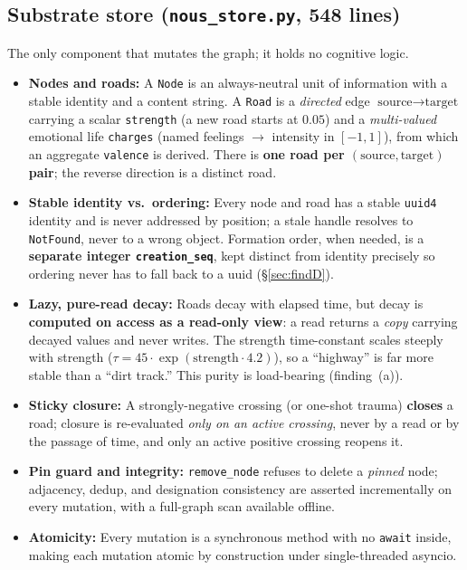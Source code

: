 \documentclass[11pt]{article}
\newcommand{\code}[1]{\texttt{#1}}
\begin{document}
\subsection{Substrate store (\code{nous_store.py}, 548 lines)}
The only component that mutates the graph; it holds no cognitive logic.
\begin{itemize}[nosep]
  \item \textbf{Nodes and roads:} A \code{Node} is an always-neutral unit of information with a stable
        identity and a content string. A \code{Road} is a \emph{directed} edge $\text{source}
        \rightarrow \text{target}$ carrying a scalar \code{strength} (a new road starts at $0.05$) and
        a \emph{multi-valued} emotional life \code{charges} (named feelings $\rightarrow$ intensity in
        $[-1,1]$), from which an aggregate \code{valence} is derived. There is \textbf{one road per
        $(\text{source}, \text{target})$ pair}; the reverse direction is a distinct road.
  \item \textbf{Stable identity vs.\ ordering:} Every node and road has a stable \code{uuid4} identity
        and is never addressed by position; a stale handle resolves to \code{NotFound}, never to a wrong
        object. Formation order, when needed, is a \textbf{separate integer \code{creation_seq}}, kept
        distinct from identity precisely so ordering never has to fall back to a uuid
        (\S\ref{sec:findD}).
  \item \textbf{Lazy, pure-read decay:} Roads decay with elapsed time, but decay is \textbf{computed on
        access as a read-only view}: a read returns a \emph{copy} carrying decayed values and never
        writes. The strength time-constant scales steeply with strength
        ($\tau = 45 \cdot \exp(\text{strength}\cdot 4.2)$), so a ``highway'' is far more stable than a
        ``dirt track.'' This purity is load-bearing (finding~(a)).
  \item \textbf{Sticky closure:} A strongly-negative crossing (or one-shot trauma) \textbf{closes} a
        road; closure is re-evaluated \emph{only on an active crossing}, never by a read or by the
        passage of time, and only an active positive crossing reopens it.
  \item \textbf{Pin guard and integrity:} \code{remove_node} refuses to delete a \emph{pinned} node;
        adjacency, dedup, and designation consistency are asserted incrementally on every mutation,
        with a full-graph scan available offline.
  \item \textbf{Atomicity:} Every mutation is a synchronous method with no \code{await} inside, making
        each mutation atomic by construction under single-threaded asyncio.
\end{itemize}
\end{document}
